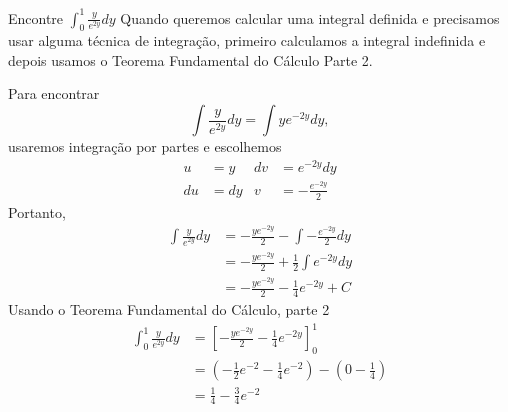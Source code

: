 \begin{example}
  Encontre \(\int_0^1 \frac{y}{e^{2y}} dy\)
  \solution
  Quando queremos calcular uma integral definida e precisamos usar alguma
  técnica de integração, primeiro calculamos a integral indefinida e depois
  usamos o Teorema Fundamental do Cálculo Parte 2.

  Para encontrar
  \[
    \int \frac{y}{e^{2y}} dy= \int y e^{-2y} dy,
  \]
  usaremos integração por partes e escolhemos
  \begin{align*}
    u  & = y  & dv & = e^{-2y} dy \\
    du & = dy & v  & = -\frac{e^{-2y}}{2}
  \end{align*}
  Portanto,
  \begin{align*}
    \int \frac{y}{e^{2y}} dy
    & =  -\frac{ye^{-2y}}{2}- \int -\frac{e^{-2y}}{2} dy \\
    & = -\frac{ye^{-2y}}{2} + \frac{1}{2} \int e^{-2y} dy \\
    & =  -\frac{ye^{-2y}}{2} - \frac{1}{4} e^{-2y}+ C
  \end{align*}
  Usando o Teorema Fundamental do Cálculo, parte 2
  \begin{align*}
    \int_0^1 \frac{y}{e^{2y}} dy
    & = \left[  -\frac{ye^{-2y}}{2} - \frac{1}{4} e^{-2y} \right] _0^1 \\
    & = \left( -\frac{1}{2}e^{-2}- \frac{1}{4}e^{-2}\right)- \left(0- \frac{1}{4} \right) \\
    & = \frac{1}{4}-\frac{3}{4}e^{-2}
  \end{align*}
\end{example}

